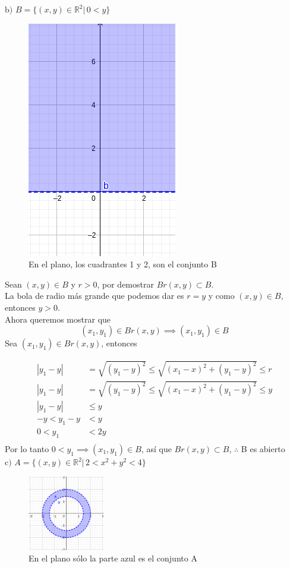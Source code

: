 \documentclass[letterpaper]{article}
\providecommand{\abs}[1]{\left|#1\right|}
\renewcommand{\*}{\cdot}
\theoremstyle{definition}
\begin{document}
$\text{b) }B = \{ (x,y) \in \mathbb{R}^2 \vert \,  0 < y  \}$
\begin{figure}[h]
	\centering
	\includegraphics[height=0.3\textwidth]{1b}
	\caption{En el plano, los cuadrantes 1 y 2, son el conjunto B}
\end{figure}
Sean $ (x,y) \in B $ y $r >0 $, por demostrar $ Br(x,y) \subset B $.\\
La bola de radio más grande que podemos dar es $ r = y $ y como $ (x,y) \in B $, entonces $ y>0 $.\\
Ahora queremos mostrar que
\[ (x_1,y_1)\in Br(x,y) \implies (x_1,y_1)\in B \]  
Sea $ (x_1, y_1)\in Br(x,y) $, entonces

\begin{align*}
	\abs{y_1 - y} &= \sqrt{(y_1 -y)^2} \leq \sqrt{(x_1 - x)^2 + (y_1 - y)^2} \leq r\\
	\abs{y_1 - y} &= \sqrt{(y_1 -y)^2} \leq \sqrt{(x_1 - x)^2 + (y_1 - y)^2} \leq y\\
	\abs{y_1 - y} &\leq y\\
	-y<y_1 - y &< y\\
	0<y_1  &< 2y\\
\end{align*}
Por lo tanto $  0< y_1 \implies (x_1, y_1) \in B$, así que $ Br(x,y) \subset B $, $ \therefore  $ B es abierto\\



\noindent$\text{c) }A = \{ (x,y) \in \mathbb{R}^2 \vert \, 2 < x^2  + y^2 < 4\}$
\begin{figure}[h]
	\centering
	\includegraphics[width=0.3\textwidth]{1c}
	\caption{En el plano sólo la parte azul es el conjunto A}
\end{figure}
\end{document}
